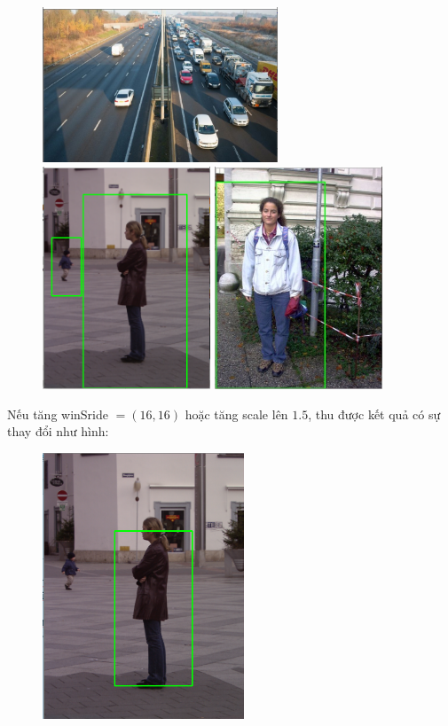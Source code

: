 \documentclass[../report.tex]{subfiles}
\begin{document}
\begin{figure}[H]
\centering
\includegraphics[width=7cm]{figures/test-1-1.png}
\includegraphics[width=5cm]{figures/test-1-2.png}
\includegraphics[width=5cm]{figures/test-1-3.png}
\end{figure}
\noindent Nếu tăng winSride $= (16,16)$ hoặc tăng  
scale lên $1.5$, thu được kết quả có sự thay đổi như hình:
\begin{figure}[H]
\centering
\includegraphics[width=6cm]{figures/test-2-1.png}
\end{figure}
\end{document}
